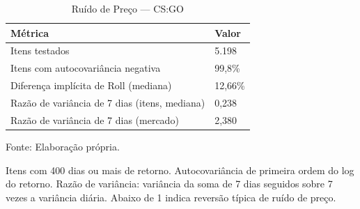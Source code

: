 \begin{table}[H]
\caption{Ruído de Preço — CS:GO}\label{tab:price_noise} 

\fontsize{12.0pt}{14.4pt}\selectfont

\begin{tabular*}{\linewidth}{@{\extracolsep{\fill}}ll}
\toprule
\textbf{Métrica} & \textbf{Valor} \\
\midrule\addlinespace[2.5pt]
Itens testados & 5.198 \\
Itens com autocovariância negativa & 99,8\% \\
Diferença implícita de Roll (mediana) & 12,66\% \\
Razão de variância de 7 dias (itens, mediana) & 0,238 \\
Razão de variância de 7 dias (mercado) & 2,380 \\
\bottomrule
\end{tabular*}
\par\vspace{\belowcaptionskip}\footnotesize Fonte: Elaboração própria.\par
\begin{minipage}{\linewidth}
Itens com 400 dias ou mais de retorno. Autocovariância de primeira ordem do log do retorno. Razão de variância: variância da soma de 7 dias seguidos sobre 7 vezes a variância diária. Abaixo de 1 indica reversão típica de ruído de preço.\\
\end{minipage}
\end{table}
